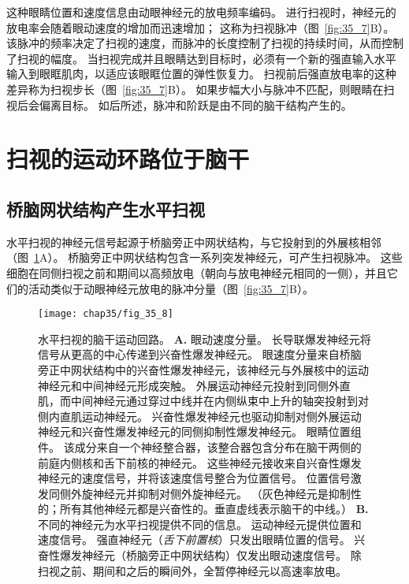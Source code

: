这种眼睛位置和速度信息由动眼神经元的放电频率编码。
进行扫视时，神经元的放电率会随着眼动速度的增加而迅速增加；
这称为扫视脉冲（图~\ref{fig:35_7}B）。
该脉冲的频率决定了扫视的速度，而脉冲的长度控制了扫视的持续时间，从而控制了扫视的幅度。
当扫视完成并且眼睛达到目标时，必须有一个新的强直输入水平输入到眼眶肌肉，以适应该眼眶位置的弹性恢复力。
扫视前后强直放电率的这种差异称为扫视步长（图~\ref{fig:35_7}B）。
如果步幅大小与脉冲不匹配，则眼睛在扫视后会偏离目标。
如后所述，脉冲和阶跃是由不同的脑干结构产生的。



\section{扫视的运动环路位于脑干}

\subsection{桥脑网状结构产生水平扫视}

水平扫视的神经元信号起源于桥脑旁正中网状结构，与它投射到的外展核相邻（图~\ref{fig:35_8}A）。
桥脑旁正中网状结构包含一系列突发神经元，可产生扫视脉冲。
这些细胞在同侧扫视之前和期间以高频放电（朝向与放电神经元相同的一侧），并且它们的活动类似于动眼神经元放电的脉冲分量（图~\ref{fig:35_7}B）。


\begin{figure}[htbp]
	\centering
	\texttt{[image: chap35/fig\_35\_8]}
	\caption{水平扫视的脑干运动回路。 
		\textbf{A.} 眼动速度分量。
		长导联爆发神经元将信号从更高的中心传递到兴奋性爆发神经元。
		眼速度分量来自桥脑旁正中网状结构中的兴奋性爆发神经元，该神经元与外展核中的运动神经元和中间神经元形成突触。
		外展运动神经元投射到同侧外直肌，而中间神经元通过穿过中线并在内侧纵束中上升的轴突投射到对侧内直肌运动神经元。
		兴奋性爆发神经元也驱动抑制对侧外展运动神经元和兴奋性爆发神经元的同侧抑制性爆发神经元。
		眼睛位置组件。
		该成分来自一个神经整合器，该整合器包含分布在脑干两侧的前庭内侧核和舌下前核的神经元。
		这些神经元接收来自兴奋性爆发神经元的速度信号，并将该速度信号整合为位置信号。
		位置信号激发同侧外旋神经元并抑制对侧外旋神经元。 （灰色神经元是抑制性的；所有其他神经元都是兴奋性的。垂直虚线表示脑干的中线。）
		\textbf{B.} 不同的神经元为水平扫视提供不同的信息。
		运动神经元提供位置和速度信号。
		强直神经元（\textit{舌下前置核}）只发出眼睛位置的信号。
		兴奋性爆发神经元（桥脑旁正中网状结构）仅发出眼动速度信号。
		除扫视之前、期间和之后的瞬间外，全暂停神经元以高速率放电。}
	\label{fig:35_8}
\end{figure}


